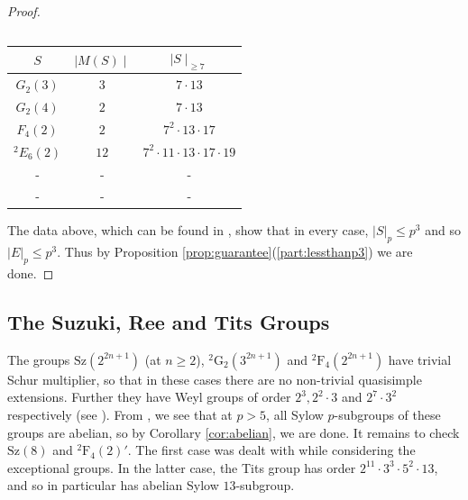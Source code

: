 \documentclass{amsart}
\theoremstyle{plain}\newtheorem{theorem}{Theorem}[section]
\theoremstyle{plain}\newtheorem{conjecture}[theorem]{Conjecture}
\theoremstyle{plain}\newtheorem{corollary}[theorem]{Corollary}
\theoremstyle{plain}\newtheorem{lemma}[theorem]{Lemma}
\theoremstyle{plain}\newtheorem{proposition}[theorem]{Proposition}
\theoremstyle{plain}\newtheorem{statement}[theorem]{}
\theoremstyle{definition}\newtheorem{definition}[theorem]{Definition}
\theoremstyle{definition}\newtheorem{example}[theorem]{Example}
\theoremstyle{definition}\newtheorem{examples}[theorem]{Examples}
\theoremstyle{definition}\newtheorem{notation}[theorem]{Notation}
\theoremstyle{definition}\newtheorem{remark}[theorem]{Remark}
\theoremstyle{definition}\newtheorem{remarks}[theorem]{Remarks}
\theoremstyle{definition}\newtheorem{question}[theorem]{Question}
\theoremstyle{definition}\newtheorem{propositiondefinition}[theorem]{Definition/Proposition}
\begin{document}
\begin{proof}
\begin{center}
{\begin{tabular}{|c|c|c|}
	\end{tabular}

	\begin{tabular}{|c|c|c|}
		\hline
			$S$ &$ \mid M(S) \mid$  &$ \mid S\mid_{\geq 7}$\\
	\hline

	\hline
			$ G_2(3)$ & $3$ & $7 \cdot 13$ \\
	\hline

			$ G_2(4) $ & $2$ & $7 \cdot 13$ \\
	\hline
			$ F_4(2)$ &$2$ & $7^2 \cdot 13 \cdot 17$\\
	\hline
			$ \hspace{0pt}^2E_6(2)$ & $12$  & $ 7^2 \cdot 11 \cdot 13 \cdot 17 \cdot 19 $\\ 
		  
	\hline 
		 	-&- &- \\
	\hline 		
			-& -& -\\
	\hline

	\end{tabular}
}
\end{center}
The data above, which can be found in \cite[Tables 24.1-24.3]{MalleTesterman}, show that in every case, $|S|_p \leq p^3$ and so $|E|_p \leq p^3$. Thus by Proposition \ref{prop:guarantee}(\ref{part:lessthanp3}) we are done.
\end{proof}

\subsection{The Suzuki, Ree and Tits Groups} The groups $\mathrm{Sz}(2^{2n+1})$  (at $n\geq 2$),  $\hspace{0pt}^2\mathrm{G}_2(3^{2n+1})$ and $\hspace{0pt}^2\mathrm{F}_4(2^{2n+1})$ have trivial Schur multiplier, so that in these cases there are no non-trivial quasisimple extensions. Further they have Weyl groups of order $2^3, 2^2 \cdot 3 $ and  $2^7 \cdot 3^2$ respectively (see \cite{Carter}). From \cite[Lemma 3.1 (2)]{FJL}, we see that at $p>5$, all Sylow $p$-subgroups of these groups are abelian, so by Corollary \ref{cor:abelian}, we are done. It remains to check $\mathrm{Sz}(8)$ and $\hspace{0pt}^2\mathrm{F}_4(2)'$. The first case was dealt with while considering the exceptional groups. In the latter case, the Tits group has order $2^{11} \cdot 3^3 \cdot 5^2 \cdot 13$, and so in particular has abelian Sylow $13$-subgroup. 
 
\end{document}
